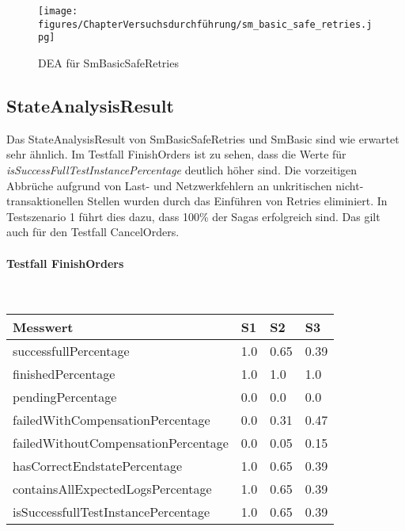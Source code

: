 \begin{figure}[h!]
	\centering
	\texttt{[image: figures/ChapterVersuchsdurchführung/sm\_basic\_safe\_retries.jpg]}
	\caption{DEA für SmBasicSafeRetries}
	\label{fig:SmBasicSafeRetries}
\end{figure}
\FloatBarrier

\subsection{StateAnalysisResult}

Das StateAnalysisResult von SmBasicSafeRetries und SmBasic sind wie erwartet sehr ähnlich. Im Testfall FinishOrders ist zu sehen, dass die Werte für \textit{isSuccessFullTestInstancePercentage} deutlich höher sind. Die vorzeitigen Abbrüche aufgrund von Last- und Netzwerkfehlern an unkritischen nicht-transaktionellen Stellen wurden durch das Einführen von Retries eliminiert. In Testszenario 1 führt dies dazu, dass 100\% der Sagas erfolgreich sind. Das gilt auch für den Testfall CancelOrders.

\paragraph*{Testfall FinishOrders} \mbox{}\\
\begin{center}
	\fontsize{9}{12}\selectfont
	\begin{longtable}[h]{|p{5cm}|p{1cm}|p{1cm}|p{1cm}|}
		\hline
		Messwert & S1 & S2 & S3 \\ \hline
		\endhead
		\endfoot
		successfull\-Percentage & 1.0 & 0.65 & 0.39 \\ \hline
		finished\-Percentage & 1.0 & 1.0 & 1.0 \\ \hline
		pending\-Percentage & 0.0 & 0.0 & 0.0 \\ \hline
		failedWithCompensation\-Percentage & 0.0 & 0.31 & 0.47 \\ \hline
		failedWithoutCompensation\-Percentage & 0.0 & 0.05 & 0.15 \\ \hline
		hasCorrectEndstate\-Percentage & 1.0 & 0.65 & 0.39 \\ \hline
		containsAllExpectedLogs\-Percentage & 1.0 & 0.65 & 0.39 \\ \hline
		isSuccessfullTestInstance\-Percentage & 1.0 & 0.65 & 0.39 \\ \hline
	\end{longtable}
\end{center}
\FloatBarrier

